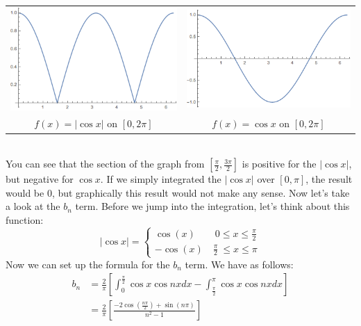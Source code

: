 \documentclass{article}
\begin{document}
\begin{center}
\begin{tabular}{c c}
\includegraphics[scale=0.5]{cos_abs} & \includegraphics[scale=0.5]{cos}\\
$f(x) = |\cos{x}|$ on $[0,2\pi]$ & $f(x) = \cos{x}$ on $[0,2\pi]$
\end{tabular}
\end{center}
\noindent\\ You can see that the section of the graph from
$[\frac{\pi}{2},\frac{3 \pi}{2}]$ is positive for the $|\cos{x}|$, but negative
for $\cos{x}$. If we simply integrated the $|\cos{x}|$ over $[0,\pi]$, the
result would be 0, but graphically this result would not make any sense. Now
let's take a look at the $b_{n}$ term. Before we jump into the integration,
let's think about this function:
\[\left|\cos{x}\right| =
\begin{cases*}
\cos(x) \qquad 0\leq x \leq \frac{\pi}{2}\\
-\cos(x)\quad  \frac{\pi}{2}\ \leq x \leq \pi
\end{cases*}
\]
\noindent Now we can set up the formula for the $b_{n}$ term. We have as follows:
\begin{align*}
b_{n} &= \frac{2}{\pi}\left[ \int_{0}^{\frac{\pi}{2}} \cos{x}\cos{nx}dx - \int_{\frac{\pi}{2}}^{\pi} \cos{x}\cos{nx}dx \right]\\
&= \frac{2}{\pi} \left[ \frac{-2 \cos{\left(\frac{n\pi}{2}\right)} + \sin{\left(n\pi\right)}}{n^{2} - 1}\right]\\
\end{align*}
\end{document}

